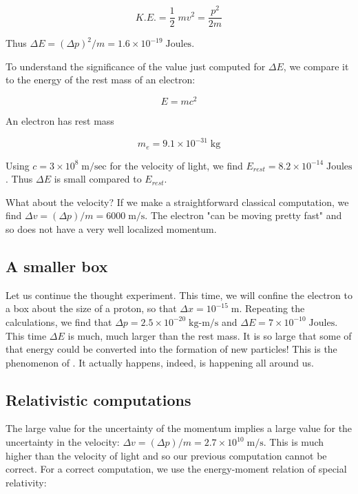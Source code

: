 \begin{equation}
  K.E. = \frac{1}{2}\;mv^2 = \frac{p^2}{2m}
\end{equation}

Thus $\Delta E = (\Delta p)^2/m = 1.6\times 10^{-19}\; \text{Joules}$.

To understand the significance of the value just computed for $\Delta E$, we compare it to the energy of the rest mass of an electron:

\begin{equation}
E = mc^2
\end{equation}

An electron has rest mass

\begin{equation}
m_e = 9.1\times 10^{-31}\;\text{kg}
\end{equation}

Using  $c = 3\times 10^8\;\text{m/sec}$ for the velocity of light, we find $E_{rest} = 8.2\times 10^{-14}\; \text{Joules}$.  Thus $\Delta E$ is small compared to $E_{rest}$.

What about the velocity?  If we make a straightforward classical computation, we find $\Delta v = (\Delta p)/m = 6000\;\text{m/s}$.  The electron  "can be moving pretty fast" and so does not have a very well localized momentum.

\subsection{A smaller box}

Let us continue the thought experiment. This time, we will confine the electron to a box about the size of a proton, so that $\Delta x = 10^{-15}\;\text{m}$.  Repeating the calculations, we find that $\Delta p = 2.5\times 10^{-20}\;\text{kg-m/s}$ and $\Delta E = 7\times 10^{-10}\;\text{Joules}$.  This time $\Delta E$ is much, much larger than the rest mass. It is so large that some of that energy could be converted into the formation of new particles!  This is the phenomenon of .  It actually happens, indeed, is happening all around us.

\subsection{ Relativistic computations}

The large value for the uncertainty of the momentum implies a large value for the uncertainty in the velocity: $\Delta v = (\Delta p)/m = 2.7\times 10^{10}\;\text{m/s}$.  This is much higher than the velocity of light and so our previous computation cannot be correct.  For a correct computation, we use the energy-moment relation of special relativity:

